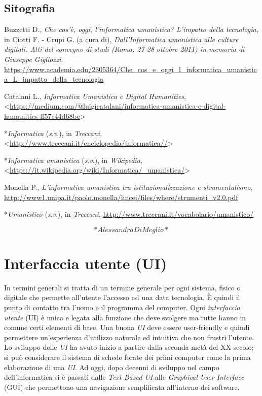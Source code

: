 \documentclass[
  b5paper,
  twoside,
  11pt,
  chapterprefix=false,
  bibliography=totocnumbered,
  parskip=0]{scrbook}
\begin{document}
\hypertarget{sitografia-18}{%
\section*{Sitografia}\label{sitografia-18}}

Buzzetti D., \emph{Che cos'è, oggi, l'informatica umanistica? L'impatto della
tecnologia}, in Ciotti F. - Crupi G. (a cura di), \emph{Dall'Informatica
umanistica alle culture digitali. Atti del convegno di studi (Roma,
27-28 ottobre 2011) in memoria di Giuseppe Gigliozzi},
\href{https://www.academia.edu/2305364/Che_cos_e_oggi_l_informatica_umanistica_L_impatto_della_tecnologia}{{https://www.academia.edu/2305364/Che\_cos\_e\_oggi\_l\_informatica\_umanistica\_L\_impatto\_della\_tecnologia}}

Catalani L., \emph{Informatica Umanistica e Digital Humanities},
\textless{}\href{https://medium.com/@luigicatalani/informatica-umanistica-e-digital-humanities-ff57c44d68be}{{https://medium.com/@luigicatalani/informatica-umanistica-e-digital-humanities-ff57c44d68be}}\textgreater{}

*\emph{Informatica} (\emph{s}.\emph{v}.), in \emph{Treccani},
\textless{}\url{http://www.treccani.it/enciclopedia/informatica//}\textgreater{}

*\emph{Informatica} \emph{umanistica} (\emph{s}.\emph{v}.), in \emph{Wikipedia},
\textless{}\url{https://it.wikipedia.org/wiki/Informatica/_umanistica/}\textgreater{}

Monella P., \emph{L'informatica umanistica tra istituzionalizzazione e
strumentalismo},
\href{http://www1.unipa.it/paolo.monella/lincei/files/where/strumenti_v2.0.pdf}{{http://www1.unipa.it/paolo.monella/lincei/files/where/strumenti\_v2.0.pdf}}

*\emph{Umanistico} (\emph{s}.\emph{v}.), in \emph{Treccani},
\href{http://www.treccani.it/vocabolario/umanistico/}{{http://www.treccani.it/vocabolario/umanistico/}}

\[*Alessandra Di Meglio*\]

\hypertarget{interfaccia-utente-ui}{%
\chapter{Interfaccia utente (UI)}\label{interfaccia-utente-ui}}

In termini generali si tratta di un termine generale per ogni sistema,
fisico o digitale che permette all'utente l'accesso ad una data
tecnologia. È quindi il punto di contatto tra l'uomo e il programma del
computer. Ogni \emph{interfaccia utente} (UI) è unica e legata alla funzione
che deve svolgere ma tutte hanno in comune certi elementi di base. Una
buona \emph{UI} deve essere user-friendly e quindi permettere un'esperienza
d'utilizzo naturale ed intuitiva che non frustri l'utente. Lo sviluppo
delle \emph{UI} ha avuto inizio a partire dalla seconda metà del XX secolo;
si può considerare il sistema di schede forate dei primi computer come
la prima elaborazione di una \emph{UI}. Ad oggi, dopo decenni di sviluppo nel
campo dell'informatica si è passati dalle \emph{Text-Based UI} alle
\emph{Graphical User Interface} (GUI) che permettono una navigazione
semplificata all'interno dei software.
\end{document}
